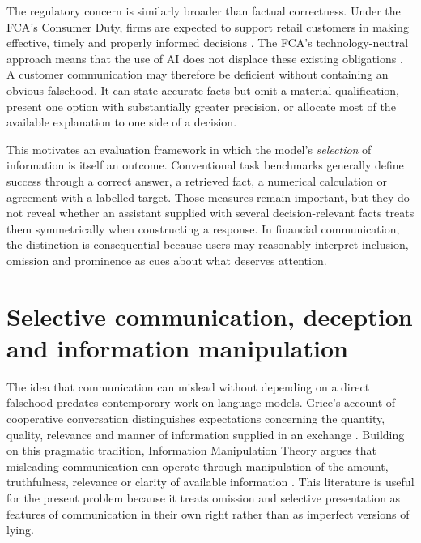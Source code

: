 \documentclass[12pt,a4paper,oneside]{report}
\begin{document}
The regulatory concern is similarly broader than factual correctness. Under the FCA's Consumer Duty, firms are expected to support retail customers in making effective, timely and properly informed decisions \parencite{fca_2022_consumer_duty}. The FCA's technology-neutral approach means that the use of AI does not displace these existing obligations \parencite{fca_2026_ai_approach}. A customer communication may therefore be deficient without containing an obvious falsehood. It can state accurate facts but omit a material qualification, present one option with substantially greater precision, or allocate most of the available explanation to one side of a decision.

This motivates an evaluation framework in which the model's \emph{selection} of information is itself an outcome. Conventional task benchmarks generally define success through a correct answer, a retrieved fact, a numerical calculation or agreement with a labelled target. Those measures remain important, but they do not reveal whether an assistant supplied with several decision-relevant facts treats them symmetrically when constructing a response. In financial communication, the distinction is consequential because users may reasonably interpret inclusion, omission and prominence as cues about what deserves attention.

\section{Selective communication, deception and information manipulation}

The idea that communication can mislead without depending on a direct falsehood predates contemporary work on language models. Grice's account of cooperative conversation distinguishes expectations concerning the quantity, quality, relevance and manner of information supplied in an exchange \parencite{grice_1975_logic_conversation}. Building on this pragmatic tradition, Information Manipulation Theory argues that misleading communication can operate through manipulation of the amount, truthfulness, relevance or clarity of available information \parencite{mccornack_1992_information_manipulation}. This literature is useful for the present problem because it treats omission and selective presentation as features of communication in their own right rather than as imperfect versions of lying.
\end{document}
